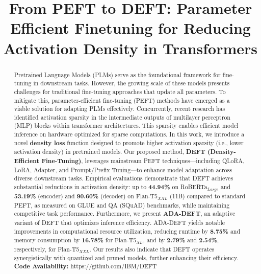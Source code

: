 \documentclass[conference]{IEEEtran}
\begin{document}
\title{From PEFT to DEFT: Parameter Efficient Finetuning for Reducing Activation Density in Transformers}

\author{
 \and {} \and {}}

\maketitle

\begin{abstract}
Pretrained Language Models (PLMs) serve as the foundational framework for fine-tuning in downstream tasks. However, the growing scale of these models presents challenges for traditional fine-tuning approaches that update all parameters. To mitigate this, parameter-efficient fine-tuning (PEFT) methods have emerged as a viable solution for adapting PLMs effectively. Concurrently, recent research has identified activation sparsity in the intermediate outputs of multilayer perceptron (MLP) blocks within transformer architectures. This sparsity enables efficient model inference on hardware optimized for sparse computations. In this work, we introduce a novel \textbf{density loss} function designed to promote higher activation sparsity (i.e., lower activation density) in pretrained models. Our proposed method, \textbf{DEFT (Density-Efficient Fine-Tuning)}, leverages mainstream PEFT techniques—including QLoRA, LoRA, Adapter, and Prompt/Prefix Tuning—to enhance model adaptation across diverse downstream tasks. Empirical evaluations demonstrate that DEFT achieves substantial reductions in activation density: up to \textbf{44.94\%} on RoBERTa\(_{Large}\) and \textbf{53.19\%} (encoder) and \textbf{90.60\%} (decoder) on Flan-T5\(_{XXL}\) (11B) compared to standard PEFT, as measured on GLUE and QA (SQuAD) benchmarks, while maintaining competitive task performance. Furthermore, we present \textbf{ADA-DEFT}, an adaptive variant of DEFT that optimizes inference efficiency. ADA-DEFT yields notable improvements in computational resource utilization, reducing runtime by \textbf{8.75\%} and memory consumption by \textbf{16.78\%} for Flan-T5\(_{XL}\), and by \textbf{2.79\%} and \textbf{2.54\%}, respectively, for Flan-T5\(_{XXL}\). Our results also indicate that DEFT operates synergistically with quantized and pruned models, further enhancing their efficiency. \textbf{Code Availability:} https://github.com/IBM/DEFT
\end{abstract}
\end{document}
